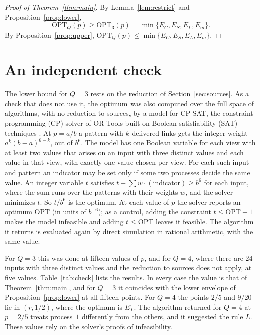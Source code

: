 \documentclass[11pt]{article}
\theoremstyle{remark}
\newcommand{\OPT}{\mathrm{OPT}}
\begin{document}
\begin{proof}[Proof of Theorem~\ref{thm:main}]
By Lemma~\ref{lem:restrict} and Proposition~\ref{prop:lower},
\[
\OPT_Q(p)\ge\OPT_3(p)=\min\{E_C,E_S,E_L,E_m\}.
\]
By Proposition~\ref{prop:upper}, $\OPT_Q(p)\le\min\{E_C,E_S,E_L,E_m\}$.
\end{proof}

\section{An independent check}\label{sec:check}

The lower bound for $Q=3$ rests on the reduction of Section~\ref{sec:sources}. As a check that does not use it, the optimum was also computed over the full space of algorithms, with no reduction to sources, by a model for CP-SAT, the constraint programming (CP) solver of OR-Tools built on Boolean satisfiability (SAT) techniques \cite{ORTools}. At $p=a/b$ a pattern with $k$ delivered links gets the integer weight $a^k(b-a)^{6-k}$, out of $b^6$. The model has one Boolean variable for each view with at least two values that arises on an input with three distinct values and each value in that view, with exactly one value chosen per view. For each such input and pattern an indicator may be set only if some two processes decide the same value. An integer variable $t$ satisfies $t+\sum w\cdot(\text{indicator})\ge b^6$ for each input, where the sum runs over the patterns with their weights $w$, and the solver minimizes $t$. So $t/b^6$ is the optimum. At each value of $p$ the solver reports an optimum $\OPT$ (in units of $b^{-6}$); as a control, adding the constraint $t\le\OPT-1$ makes the model infeasible and adding $t\le\OPT$ leaves it feasible. The algorithm it returns is evaluated again by direct simulation in rational arithmetic, with the same value.

For $Q=3$ this was done at fifteen values of $p$, and for $Q=4$, where there are $24$ inputs with three distinct values and the reduction to sources does not apply, at five values. Table~\ref{tab:check} lists the results. In every case the value is that of Theorem~\ref{thm:main}, and for $Q=3$ it coincides with the lower envelope of Proposition~\ref{prop:lower} at all fifteen points. For $Q=4$ the points $2/5$ and $9/20$ lie in $(r,1/2)$, where the optimum is $E_L$. The algorithm returned for $Q=4$ at $p=2/5$ treats process~$1$ differently from the others, and it suggested the rule $L$. These values rely on the solver's proofs of infeasibility.
\end{document}
